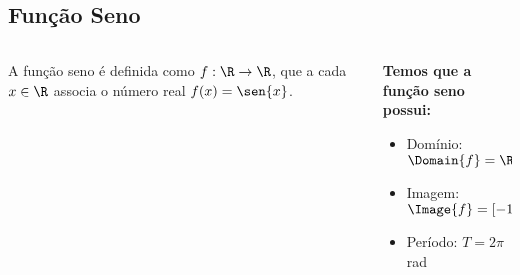 \subsection{Função Seno}
\begin{frame}
  \begin{columns}[onlytextwidth]
    \begin{column}{0.49\textwidth}\vspace{-0.5cm}
      \begin{definition}
        A função seno é definida como $f:\R\rightarrow\R$, que a cada $x\in\R$ associa o número real $f(x)=\sen{x}$.
      \end{definition}
    \end{column}
    \begin{column}{0.49\textwidth}\vspace*{-0.5cm}
      \begin{highlight}
        \textbf{Temos que a função seno possui:}
        \begin{itemize}
          \item Domínio: $\Domain{f} = \R$
          \item Imagem: $\Image{f} = [-1,\,1]$
          \item Período: $T = 2\pi$ rad
        \end{itemize}
      \end{highlight}
    \end{column}
  \end{columns}
  \begin{figure}
  \end{figure}
\end{frame}

\begin{frame}[c]
  \begin{figure}
  \end{figure}
\end{frame}

